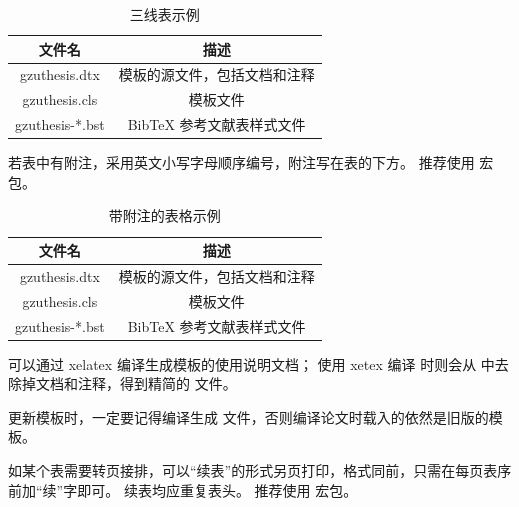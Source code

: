 \begin{table}
  \centering
  \caption{三线表示例}
  \begin{tabular}{cc}
    \toprule
    文件名          & 描述                         \\
    \midrule
    gzuthesis.dtx   & 模板的源文件，包括文档和注释 \\
    gzuthesis.cls   & 模板文件                     \\
    gzuthesis-*.bst & BibTeX 参考文献表样式文件    \\
    \bottomrule
  \end{tabular}
  \label{tab:three-line}
\end{table}

若表中有附注，采用英文小写字母顺序编号，附注写在表的下方。
推荐使用  宏包。

\begin{table}
  \centering
  \begin{threeparttable}[c]
    \caption{带附注的表格示例}
    \label{tab:three-part-table}
    \begin{tabular}{cc}
      \toprule
      文件名                 & 描述                         \\
      \midrule
      gzuthesis.dtx\tnote{a} & 模板的源文件，包括文档和注释 \\
      gzuthesis.cls\tnote{b} & 模板文件                     \\
      gzuthesis-*.bst        & BibTeX 参考文献表样式文件    \\
      \bottomrule
    \end{tabular}
    \begin{tablenotes}
      \item [a] 可以通过 xelatex 编译生成模板的使用说明文档；
        使用 xetex 编译  时则会从  中去除掉文档和注释，得到精简的  文件。
      \item [b] 更新模板时，一定要记得编译生成  文件，否则编译论文时载入的依然是旧版的模板。
    \end{tablenotes}
  \end{threeparttable}
\end{table}

如某个表需要转页接排，可以“续表”的形式另页打印，格式同前，只需在每页表序前加“续”字即可。
续表均应重复表头。
推荐使用  宏包。

